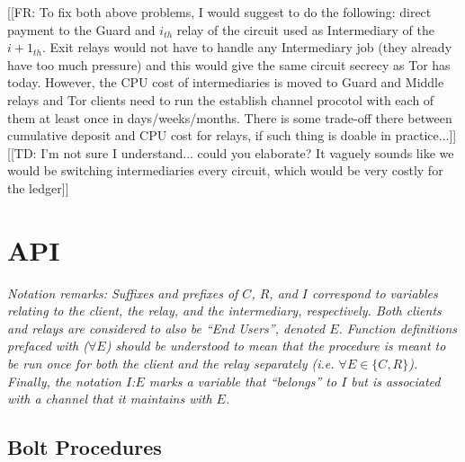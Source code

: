 \documentclass{article}
\newcommand{\flo}[1]{ {\color{blue} [[FR: #1]]}}
\newcommand{\thi}[1]{ {\color{red} [[TD: #1]]}}
\begin{document}
\flo{To fix both above problems, I would suggest to do the following: direct payment to the Guard and $i_{th}$ relay of the circuit used as Intermediary of the $i+1_{th}$. Exit relays would not have to handle any Intermediary job (they already have too much pressure) and this would give the same circuit secrecy as Tor has today. However, the CPU cost of intermediaries is moved to Guard and Middle relays and Tor clients need to run the establish channel procotol with each of them at least once in days/weeks/months. There is some trade-off there between cumulative deposit and CPU cost for relays, if such thing is doable in practice...}
\thi{I'm not sure I understand... could you elaborate? It vaguely sounds like we would be switching intermediaries every circuit, which would be very costly for the ledger}

\section{API}

\textit{Notation remarks: Suffixes and prefixes of $C$, $R$, and $I$ correspond to variables relating to the client, the relay, and the intermediary, respectively. Both clients and relays are considered to also be ``End Users'', denoted $E$. Function definitions prefaced with ($\forall E$) should be understood to mean that the procedure is meant to be run once for both the client and the relay separately (i.e. $\forall E \in \{C, R\}$). Finally, the notation $I$:$E$ marks a variable that ``belongs'' to $I$ but is associated with a channel that it maintains with $E$.}

\subsection{Bolt Procedures}
\end{document}
